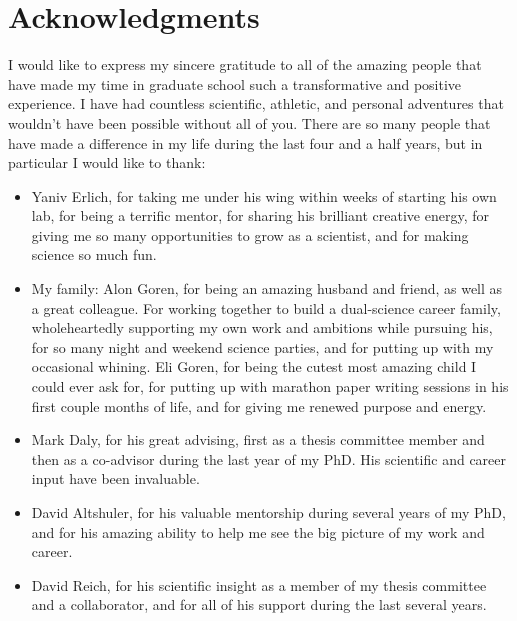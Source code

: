 \section*{Acknowledgments}

I would like to express my sincere gratitude to all of the amazing people that have made my time in graduate school such a transformative and positive experience. I have had countless scientific, athletic, and personal adventures that wouldn't have been possible without all of you. There are so many people that have made a difference in my life during the last four and a half years, but in particular I would like to thank: 

\begin{itemize}

\item Yaniv Erlich, for taking me under his wing within weeks of starting his own lab, for being a terrific mentor, for sharing his brilliant creative energy, for giving me so many opportunities to grow as a scientist, and for making science so much fun.

\item My family: Alon Goren, for being an amazing husband and friend, as well as a great colleague. For
working together to build a dual-science career family, wholeheartedly supporting my own work and ambitions while pursuing his, for so many night and weekend science parties, and for putting up with my occasional whining. Eli Goren, for being the cutest most amazing child I could ever ask for, for putting up with marathon paper writing sessions in his first couple months of life, and for giving me renewed purpose and energy.

\item Mark Daly, for his great advising, first as a thesis committee member and then as a co-advisor during the last year of my PhD. His scientific and career input have been invaluable.

\item David Altshuler, for his valuable mentorship during several years of my PhD, and for his amazing ability to help me see the big picture of my work and career.

\item David Reich, for his scientific insight as a member of my thesis committee and a collaborator, and for all of his support during the last several years.


\end{itemize}
